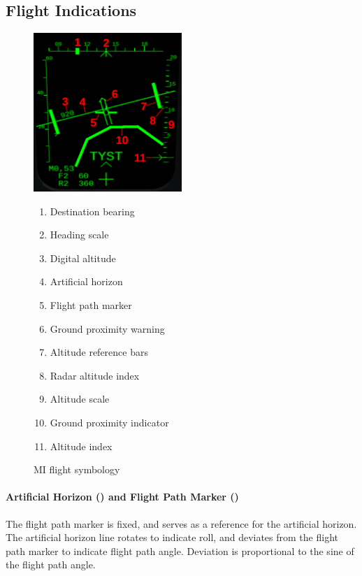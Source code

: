 \subsection{Flight Indications}
\begin{figure}[!ht]
  \centering
  \includegraphics[width=0.5\textwidth]{images/displays/MI-flight.png}

  \begin{multicols}{2}
    \begin{enumerate}[nosep]
      \item \label{item:heading-bug} Destination bearing
      \item \label{item:heading} Heading scale
      \item \label{item:dig-alt} Digital altitude
      \item \label{item:horizon} Artificial horizon
      \item \label{item:fpv} Flight path marker
      \item \label{item:gpw-arrow} Ground proximity warning
      \item \label{item:alt-bars} Altitude reference bars
      \item \label{item:rhm-index} Radar altitude index
      \item \label{item:alt-scale} Altitude scale
      \item \label{item:ground} Ground proximity indicator
      \item \label{item:alt-index} Altitude index
    \end{enumerate}
  \end{multicols}

  \caption{MI flight symbology}
  \label{fig:mi-flight}
\end{figure}

\paragraph{%
  Artificial Horizon ()
  and Flight Path Marker ()
}
The flight path marker is fixed, and serves as a reference for the artificial horizon.
The artificial horizon line rotates to indicate roll,
and deviates from the flight path marker to indicate flight path angle.
Deviation is proportional to the sine of the flight path angle.

